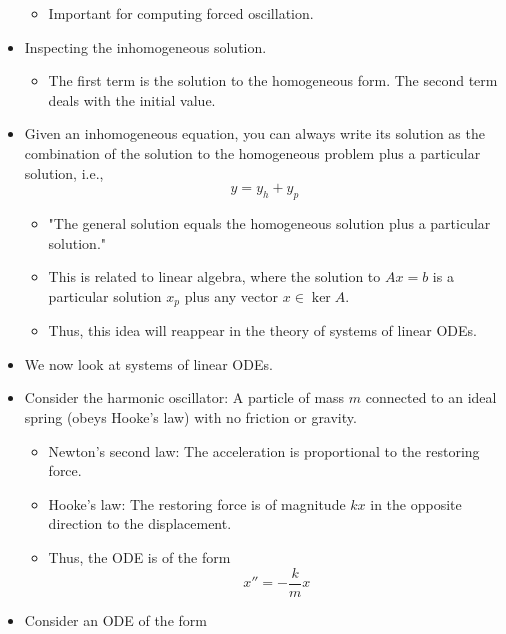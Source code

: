 \documentclass[../notes.tex]{subfiles}
\begin{document}
\begin{itemize}
\begin{equation*}
    \end{equation*}
    \begin{itemize}
        \item Important for computing forced oscillation.
    \end{itemize}
    \item Inspecting the inhomogeneous solution.
    \begin{itemize}
        \item The first term is the solution to the homogeneous form. The second term deals with the initial value.
    \end{itemize}
    \item Given an inhomogeneous equation, you can always write its solution as the combination of the solution to the homogeneous problem plus a particular solution, i.e.,
    \begin{equation*}
        y = y_h+y_p
    \end{equation*}
    \begin{itemize}
        \item "The general solution equals the homogeneous solution plus a particular solution."
        \item This is related to linear algebra, where the solution to $Ax=b$ is a particular solution $x_p$ plus any vector $x\in\ker A$.
        \item Thus, this idea will reappear in the theory of systems of linear ODEs.
    \end{itemize}
    \item We now look at systems of linear ODEs.
    \item Consider the harmonic oscillator: A particle of mass $m$ connected to an ideal spring (obeys Hooke's law) with no friction or gravity.
    \begin{itemize}
        \item Newton's second law: The acceleration is proportional to the restoring force.
        \item Hooke's law: The restoring force is of magnitude $kx$ in the opposite direction to the displacement.
        \item Thus, the ODE is of the form
        \begin{equation*}
            x'' = -\frac{k}{m}x
        \end{equation*}
    \end{itemize}
    \item Consider an ODE of the form
    \begin{equation*}

\end{equation*}
\end{itemize}
\end{document}
